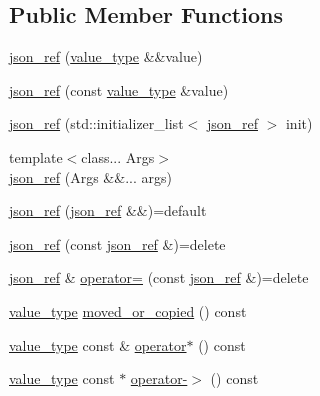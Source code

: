 \subsection*{Public Member Functions}
\begin{DoxyCompactItemize}
\item 
\hyperlink{classnlohmann_1_1detail_1_1json__ref_ae1adf5bcee8b6fa0c358710604fb1938}{json\+\_\+ref} (\hyperlink{classnlohmann_1_1detail_1_1json__ref_a78d76cf288141049568c0d670ed670ef}{value\+\_\+type} \&\&value)
\item 
\hyperlink{classnlohmann_1_1detail_1_1json__ref_a8c3eb3c6e952ed0cd7eece586ab4047c}{json\+\_\+ref} (const \hyperlink{classnlohmann_1_1detail_1_1json__ref_a78d76cf288141049568c0d670ed670ef}{value\+\_\+type} \&value)
\item 
\hyperlink{classnlohmann_1_1detail_1_1json__ref_adfba2db547283a7c6a5df9a32e72efc5}{json\+\_\+ref} (std\+::initializer\+\_\+list$<$ \hyperlink{classnlohmann_1_1detail_1_1json__ref}{json\+\_\+ref} $>$ init)
\item 
{\footnotesize template$<$class... Args$>$ }\\\hyperlink{classnlohmann_1_1detail_1_1json__ref_abe3ef8c2f07430bd5699bbd552f9e9c3}{json\+\_\+ref} (Args \&\&... args)
\item 
\hyperlink{classnlohmann_1_1detail_1_1json__ref_a59221ddbd756ca24d289c787fab38dbc}{json\+\_\+ref} (\hyperlink{classnlohmann_1_1detail_1_1json__ref}{json\+\_\+ref} \&\&)=default
\item 
\hyperlink{classnlohmann_1_1detail_1_1json__ref_a4c68db46934e03588bbd73b00147c0dd}{json\+\_\+ref} (const \hyperlink{classnlohmann_1_1detail_1_1json__ref}{json\+\_\+ref} \&)=delete
\item 
\hyperlink{classnlohmann_1_1detail_1_1json__ref}{json\+\_\+ref} \& \hyperlink{classnlohmann_1_1detail_1_1json__ref_a98956ba676b1ae16b62346f9c4fb752e}{operator=} (const \hyperlink{classnlohmann_1_1detail_1_1json__ref}{json\+\_\+ref} \&)=delete
\item 
\hyperlink{classnlohmann_1_1detail_1_1json__ref_a78d76cf288141049568c0d670ed670ef}{value\+\_\+type} \hyperlink{classnlohmann_1_1detail_1_1json__ref_ae39e523218bf05cac3fb5b5b1cd5efb6}{moved\+\_\+or\+\_\+copied} () const
\item 
\hyperlink{classnlohmann_1_1detail_1_1json__ref_a78d76cf288141049568c0d670ed670ef}{value\+\_\+type} const  \& \hyperlink{classnlohmann_1_1detail_1_1json__ref_aa3100e41472dba02ab78ccc1607e44ab}{operator$\ast$} () const
\item 
\hyperlink{classnlohmann_1_1detail_1_1json__ref_a78d76cf288141049568c0d670ed670ef}{value\+\_\+type} const  $\ast$ \hyperlink{classnlohmann_1_1detail_1_1json__ref_adb652774a67829876449dc0b30637456}{operator-\/$>$} () const
\end{DoxyCompactItemize}


